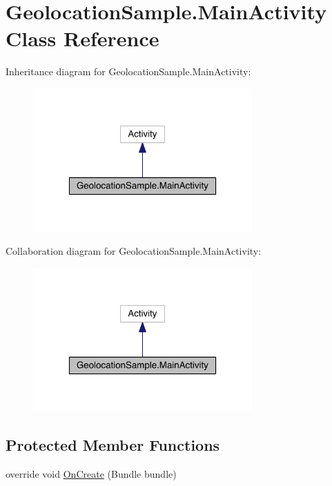 \hypertarget{class_geolocation_sample_1_1_main_activity}{\section{Geolocation\+Sample.\+Main\+Activity Class Reference}
\label{class_geolocation_sample_1_1_main_activity}
}


Inheritance diagram for Geolocation\+Sample.\+Main\+Activity\+:
\nopagebreak
\begin{figure}[H]
\begin{center}
\leavevmode
\includegraphics[width=238pt]{class_geolocation_sample_1_1_main_activity__inherit__graph}
\end{center}
\end{figure}


Collaboration diagram for Geolocation\+Sample.\+Main\+Activity\+:
\nopagebreak
\begin{figure}[H]
\begin{center}
\leavevmode
\includegraphics[width=238pt]{class_geolocation_sample_1_1_main_activity__coll__graph}
\end{center}
\end{figure}
\subsection*{Protected Member Functions}
\begin{DoxyCompactItemize}
\item 
override void \hyperlink{class_geolocation_sample_1_1_main_activity_a301a8f6687537f17faaf1f6c2f4965af}{On\+Create} (Bundle bundle)
\end{DoxyCompactItemize}


